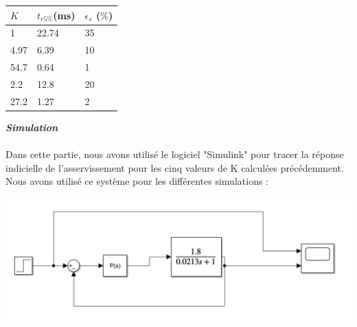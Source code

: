 \documentclass[12pt]{article}
\begin{document}
\begin{center}
    \begin{tabular}{ |p{3cm}|p{3cm}|p{3cm}|}

        \hline
        $K$ & $t_{r5\%}$(ms) & $\epsilon_s$ ($\%$)\\
        \hline
        1 & 22.74 & 35\\
        4.97 & 6.39 & 10\\
        54.7 & 0.64 & 1\\
        2.2& 12.8 & 20\\
        27.2 & 1.27  & 2\\
        
        
        \hline
        \end{tabular}
    \end{center}
\newpage 
\Large \textit{ \textbf{Simulation}}
\\\\\normalsize Dans cette partie, nous avons utilisé le logiciel "Simulink" pour tracer la réponse indicielle de l'asservissement pour les cinq valeurs de K calculées précédemment. Nous avons utilisé ce système pour les différentes simulations : 
\begin{center}
    \includegraphics[width = 15 cm]{TP2 Simulink/Syst_1/Syst_1_Simulink_P.png}
\end{center}
\end{document}
